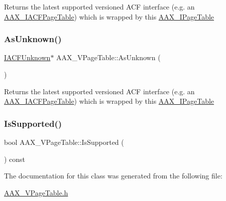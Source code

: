 Returns the latest supported versioned A\+CF interface (e.\+g. an \mbox{\hyperlink{a01725}{A\+A\+X\+\_\+\+I\+A\+C\+F\+Page\+Table}}) which is wrapped by this \mbox{\hyperlink{a01849}{A\+A\+X\+\_\+\+I\+Page\+Table}} \mbox{\label{a01929_aa6cba81c1036cd3fe0a108800e60ea62}} 
\subsubsection{\texorpdfstring{AsUnknown()}{AsUnknown()}\hspace{0.1cm}{\footnotesize\ttfamily [2/2]}}
{\footnotesize\ttfamily \mbox{\hyperlink{a01409}{I\+A\+C\+F\+Unknown}}$\ast$ A\+A\+X\+\_\+\+V\+Page\+Table\+::\+As\+Unknown (\begin{DoxyParamCaption}{ }\end{DoxyParamCaption})\hspace{0.3cm}{\ttfamily [inline]}}





Returns the latest supported versioned A\+CF interface (e.\+g. an \mbox{\hyperlink{a01725}{A\+A\+X\+\_\+\+I\+A\+C\+F\+Page\+Table}}) which is wrapped by this \mbox{\hyperlink{a01849}{A\+A\+X\+\_\+\+I\+Page\+Table}} \mbox{\label{a01929_af4f8bb73e227aff93f9405e8167c1e1f}} 
\subsubsection{\texorpdfstring{IsSupported()}{IsSupported()}}
{\footnotesize\ttfamily bool A\+A\+X\+\_\+\+V\+Page\+Table\+::\+Is\+Supported (\begin{DoxyParamCaption}{ }\end{DoxyParamCaption}) const\hspace{0.3cm}{\ttfamily [inline]}}



The documentation for this class was generated from the following file\+:\begin{DoxyCompactItemize}
\item 
\mbox{\hyperlink{a00719}{A\+A\+X\+\_\+\+V\+Page\+Table.\+h}}\end{DoxyCompactItemize}
